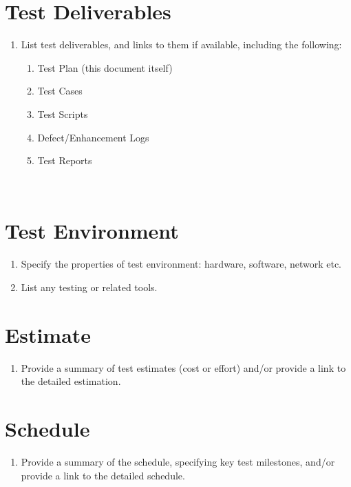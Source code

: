 \section{Test Deliverables}

\begin{enumerate}
	\item List test deliverables, and links to them if available, including the following:

\begin{enumerate}
	\item Test Plan (this document itself)
	\item Test Cases
	\item Test Scripts
	\item Defect/Enhancement Logs
	\item Test Reports
\end{enumerate}
\end{enumerate}
~
\section{Test Environment}

\begin{enumerate}
	\item Specify the properties of test environment: hardware, software, network etc.
	\item List any testing or related tools.
\end{enumerate}

\section{Estimate}

\begin{enumerate}
	\item Provide a summary of test estimates (cost or effort) and/or provide a link to the detailed estimation.
\end{enumerate}

\section{Schedule}

\begin{enumerate}
	\item Provide a summary of the schedule, specifying key test milestones, and/or provide a link to the detailed schedule.
\end{enumerate}


